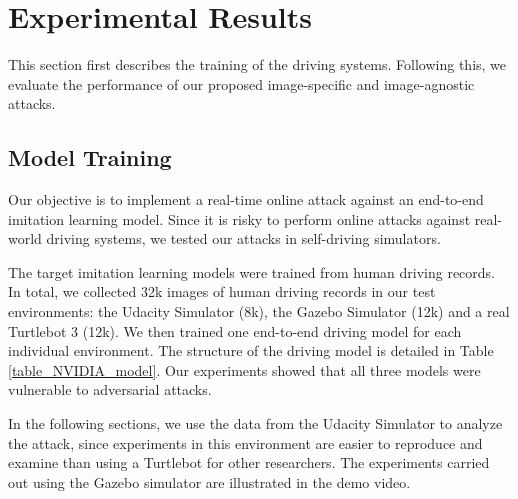 \section{Experimental Results}

This section first describes the training of the driving systems. Following this, we evaluate the performance of our proposed image-specific and image-agnostic attacks.



\subsection{Model Training}

Our objective is to implement a real-time online attack against an end-to-end imitation learning model. Since it is risky to perform online attacks against real-world driving systems, we tested our attacks in self-driving simulators. 

The target imitation learning models were trained from human driving records. In total, we collected 32k images of human driving records in our test environments: the Udacity Simulator (8k), the Gazebo Simulator (12k) and a real Turtlebot 3 (12k). We then trained one end-to-end driving model for each individual environment. The structure of the driving model is detailed in Table \ref{table_NVIDIA_model}.
Our experiments showed that all three models were vulnerable to adversarial attacks. 

In the following sections, we use the data from the Udacity Simulator to analyze the attack, since experiments in this environment are easier to reproduce and examine than using a Turtlebot for other researchers. The experiments carried out using the Gazebo simulator are illustrated in the demo video.



